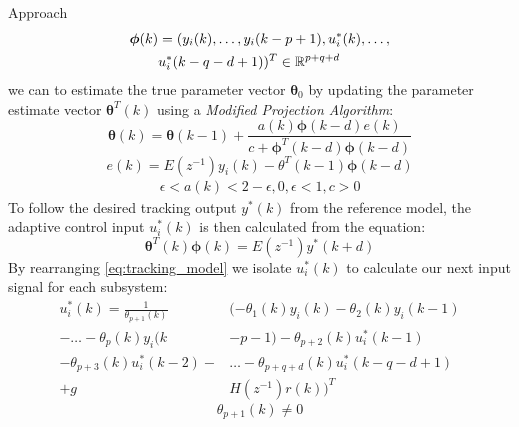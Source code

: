 \begin{section}{Approach}
	\begin{align}
	\begin{split}
	\bm{\phi}(k)&=(y_i(k), \dots ,y_i(k-p+1),u^*_i(k), \dots , \\
	& u^*_i(k-q-d+1))^T \in \mathbb{R}^{p+q+d}
	\end{split}
	\end{align}
we can to estimate the true parameter vector $\bm{\theta}_0$ by updating the parameter estimate vector $\bm{\theta}^T(k)$ using a \textit{Modified Projection Algorithm}:
	\begin{equation}
	\label{eq:Modified_Proj_Algorithm}
	\bm{\theta}(k)=\bm{\theta}(k-1)+\frac{a(k)\bm{\phi}(k-d)e(k)}{c+\bm{\phi}^T(k-d)\bm{\phi}(k-d)}
	\end{equation}
	\begin{equation}
	e(k)=E(z^{-1})y_i(k)-\theta^T(k-1)\bm{\phi}(k-d)
	\end{equation}
	\begin{align*}
	\epsilon<a(k)<2-\epsilon, 0,\epsilon<1, c>0
	\end{align*}
To follow the desired tracking output $y^*(k)$ from the reference model, the adaptive control input $u^*_i(k)$ is then calculated from the equation:
    \begin{equation}
    \label{eq:tracking_model}
	\bm{\theta}^T(k)\bm{\phi}(k)=E(z^{-1})y^*(k+d)
	\end{equation}
By rearranging \eqref{eq:tracking_model} we isolate $u^*_i(k)$ to calculate our next input signal for each subsystem:
	\begin{align}
	\label{eq:End}
	u^*_i(k)=\frac{1}{\theta_{p+1}(k)}&(-\theta_1(k)y_i(k)-\theta_2(k)y_i(k-1)  \nonumber \\
    -\dots-\theta_p(k)y_i(k&-p-1)-\theta_{p+2}(k)u^*_i(k-1)  \\
	-\theta_{p+3}(k)u^*_i(k-2)-& \dots - \theta_{p+q+d}(k)u^*_i(k-q-d+1) \nonumber \\
	+g&H(z^{-1})r(k))^T \nonumber
	\end{align}
    \begin{equation}
	\theta_{p+1}(k)\neq0 \nonumber
	\end{equation}


\end{section}
